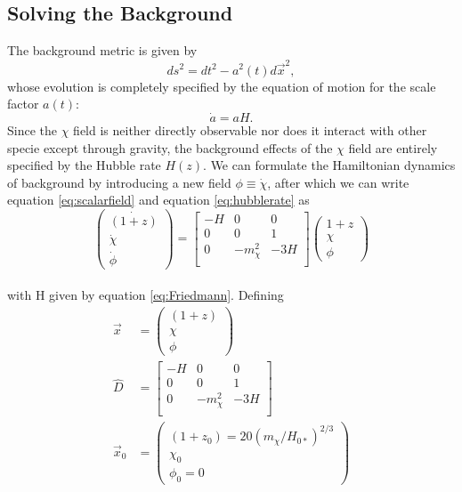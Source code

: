 \documentclass{emulateapj}
\begin{document}
\subsection{Solving the Background}
The background metric is given by
\begin{equation}
ds^2 = dt^2 - a^2(t)d\vec{x}^2,
\end{equation}
whose evolution is completely specified by the equation of motion for the scale factor $a(t)$:
\begin{equation}
\dot{a} = a H.
\end{equation}
Since the $\chi$ field is neither directly observable nor does it interact with other specie except through gravity, the background effects of the $\chi$ field are entirely specified by the Hubble rate $H(z)$.  We can formulate the Hamiltonian dynamics of background by introducing a new field $\phi \equiv \dot{\chi}$, after which we can write equation \ref{eq:scalarfield} and equation \ref{eq:hubblerate} as
\begin{equation}
\label{eq:hamiltonian}
\left(
\begin{array}{c}
\dot{\left(1+z\right)} \\ \dot{\chi} \\ \dot{\phi}
\end{array}\right) = \left[
 \begin{array}{ccc}
 -H & 0 & 0 \\
 0 & 0 & 1 \\
 0 & -m_\chi^2 & - 3 H \\
 \end{array}
 \right]
 \left(
 \begin{array}{c}
1+z \\ \chi \\ \phi
 \end{array}
 \right)
\end{equation}
\\
with H given by equation \ref{eq:Friedmann}.  Defining
\begin{align*}
\vec{x} &= \left(\begin{array}{c}
\left(1+z\right) \\ \chi \\ \phi
\end{array}\right) \\ 
\hat{D} &=\left[
 \begin{array}{ccc}
 -H & 0 & 0 \\
 0 & 0 & 1 \\
 0 & -m_\chi^2 & - 3 H \\
 \end{array}
 \right] \\ 
\vec{x}_0 &= \left(\begin{array}{c}
\left(1+z_0\right) = 20\left(m_\chi / H_{0*}\right)^{2/3} \\ \chi_0 \\ \phi_0 = 0
\end{array}\right) \\ 
\end{align*}
\end{document}
